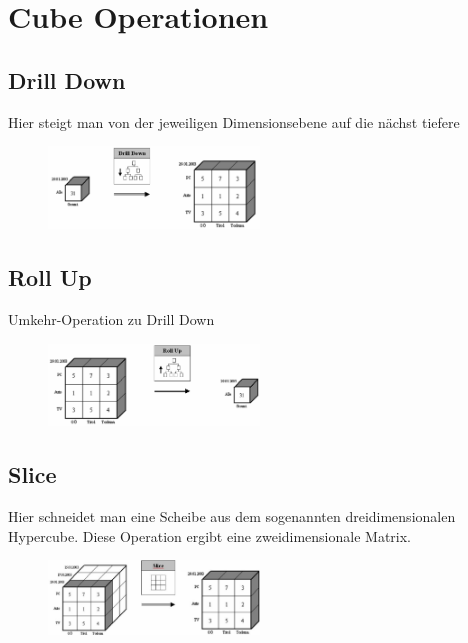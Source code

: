 \section{Cube Operationen}

\subsection{Drill Down}

Hier steigt man von der jeweiligen Dimensionsebene auf die nächst tiefere

\begin{figure}[H]
    \centering
    \includegraphics[width=0.5\textwidth]{Content/images/dwh/drill.png}
    \caption{}
\end{figure}

\subsection{Roll Up}

Umkehr-Operation zu Drill Down
\begin{figure}[H]
    \centering
    \includegraphics[width=0.5\textwidth]{Content/images/dwh/rollup.png}
    \caption{}
\end{figure}

\subsection{Slice}

Hier schneidet man eine Scheibe aus dem sogenannten dreidimensionalen Hypercube. Diese Operation ergibt eine zweidimensionale Matrix.
\begin{figure}[H]
    \centering
    \includegraphics[width=0.5\textwidth]{Content/images/dwh/slice.png}
    \caption{}
\end{figure}

